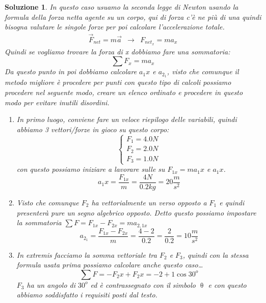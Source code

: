 \documentclass{article}
\newtheorem{sol}{Soluzione}[section]
\begin{document}
\begin{sol}
  In questo caso usuamo la seconda legge di Newton usando la formula della forza netta agente su un corpo, qui di forza c'è ne più di una quindi bisogna valutare le singole forze per poi calcolare l'accelerazione totale.
  \begin{eqnarray*}
    \vec{F}_{net}=m\vec{a} & \to{} & F_{net_x}=ma_x 
  \end{eqnarray*}
  Quindi se vogliamo trovare la forza di x dobbiamo fare una sommatoria:
  \begin{equation*}
    \sum F_x=ma_x
  \end{equation*}
  Da questo punto in poi dobbiamo calcolare $a_1x$ e $a_{2_1}$, visto che comunque il metodo migliore è procedere per punti con questo tipo di calcoli possiamo procedere nel seguente modo, creare un elenco ordinato e procedere in questo modo per evitare inutili disordini.
  \begin{enumerate}
  \item In primo luogo, conviene fare un veloce riepilogo delle variabili, quindi abbiamo 3 vettori/forze in gioco su questo corpo:
    \begin{equation*}
      \begin{cases}
        F_1=4.0N\\
        F_2=2.0N\\
        F_3=1.0N
      \end{cases}
    \end{equation*}
    con questo possiamo iniziare a lavorare sulle su $F_{1x}=ma_1x$ e $a_1x$.
    \begin{equation*}
      a_1x=\frac{F_{1x}}{m}=\frac{4N}{0.2kg}=20\frac{m}{s^2}
    \end{equation*}
  \item Visto che comunque $F_2$ ha vettorialmente un verso opposto a $F_1$ e quindi presenterà pure un segno algebrico opposto. Detto questo possiamo impostare la sommatoria $\sum F= F_{1x}-F_{2x}=ma_{2,1x}$
    \begin{equation*}
      a_{2_1}= \frac{F_{1x}-F_{2x}}{m}= \frac{4-2}{0.2}=\frac{2}{0.2}=10\frac{m}{s^2}
    \end{equation*}
  \item In extremis facciamo la somma vettoriale tra $F_2$ e $F_3$, quindi con la stessa formula usata prima possiamo calcolare anche questo caso\dots{}
    \begin{equation*}
      \sum F= -F_2x+F_2x=-2+1\cos30^o
    \end{equation*}
    $F_3$ ha un angolo di $30^o$ ed è contrassegnato con il simbolo $\uptheta$ e con questo abbiamo soddisfatto i requisiti posti dal testo.
  \end{enumerate}
\end{sol}
\end{document}
